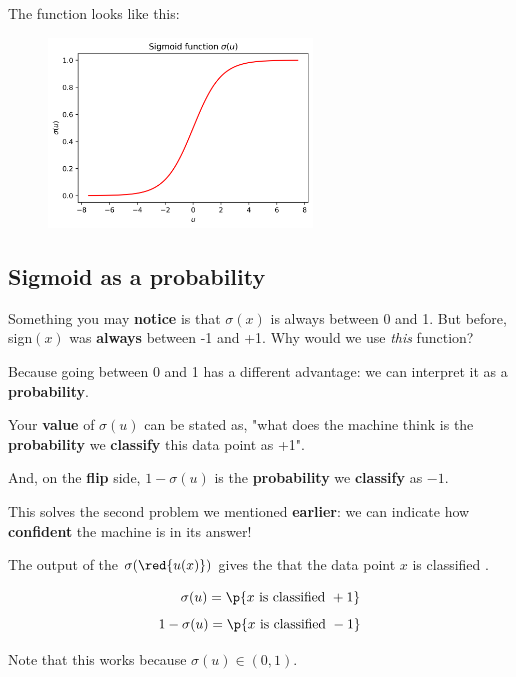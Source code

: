         The function looks like this:
        
        \begin{figure}[H]
            \centering
            
            \includegraphics[width=70mm,scale=0.5]{images/classification_images/sigmoid_u.png}
        \end{figure}
        
    \subsection{Sigmoid as a probability}
        
        Something you may \textbf{notice} is that $\sigma(x)$ is always between 0 and 1. But before, sign$(x)$ was \textbf{always} between -1 and +1. Why would we use \textit{this} function?
        
        Because going between 0 and 1 has a different advantage: we can interpret it as a \textbf{probability}.
        
        Your \textbf{value} of $\sigma(u)$ can be stated as, "what does the machine think is the \textbf{probability} we \textbf{classify} this data point as +1".
        
        And, on the \textbf{flip} side, $1-\sigma(u)$ is the \textbf{probability} we \textbf{classify} as $-1$.
        
        This solves the second problem we mentioned \textbf{earlier}: we can indicate how \textbf{confident} the machine is in its answer!\\
        
        \begin{concept}
            The output of the  $\sigma(\red{u(x)})$ gives the  that the data point $x$ is classified .
            
            \begin{equation*}
                \quad \;\; \sigma(u) = \p{ x\text{ is classified }+1 }
            \end{equation*}
            \begin{equation*}
                1 - \sigma(u) = \p{ x\text{ is classified }-1 }
            \end{equation*}
            
            Note that this works because $\sigma(u) \in (0,1)$.
        \end{concept}
        
